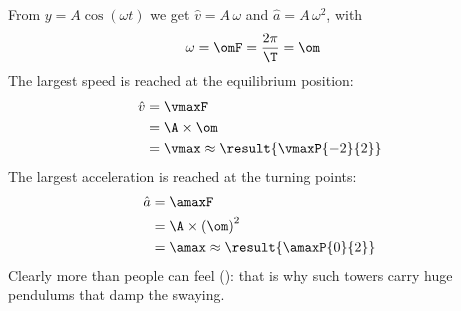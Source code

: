 From $y = A\cos(\omega t)$ we get $\hat v = A\,\omega$ and $\hat a = A\,\omega^2$, with
\begin{align}
 \omega &= \omF = \frac{2\pi}{\T} = \om
\end{align}
The largest speed is reached at the equilibrium position:
\begin{align}
 \hat v &= \vmaxF \\
   &= \A\times\om \\
   &= \vmax \approx \result{\vmaxP{-2}{2}}
\end{align}
The largest acceleration is reached at the turning points:
\begin{align}
 \hat a &= \amaxF \\
   &= \A\times\left(\om\right)^2 \\
   &= \amax \approx \result{\amaxP{0}{2}}
\end{align}
Clearly more than people can feel (\afO): that is why such towers carry huge pendulums that damp the swaying.
